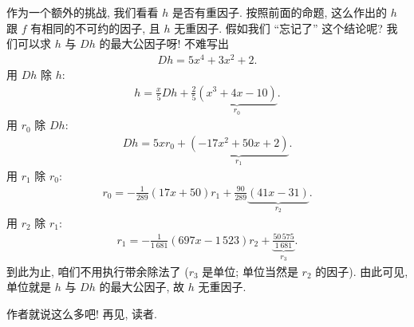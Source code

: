 \begin{example}
    作为一个额外的挑战, 我们看看 $h$ 是否有重因子. 按照前面的命题, 这么作出的 $h$ 跟 $f$ 有相同的不可约的因子, 且 $h$ 无重因子. 假如我们 ``忘记了'' 这个结论呢? 我们可以求 $h$ 与 $Dh$ 的最大公因子呀! 不难写出
    \begin{align*}
        Dh = 5x^4 + 3x^2 + 2.
    \end{align*}
    用 $Dh$ 除 $h$:
    \begin{align*}
        h = \frac{x}{5} Dh + \frac{2}{5} \underbrace{(x^3+4 x-10)}_{r_0}.
    \end{align*}
    用 $r_0$ 除 $Dh$:
    \begin{align*}
        Dh = 5x r_0 + \underbrace{(-17x^2 + 50x + 2)}_{r_1}.
    \end{align*}
    用 $r_1$ 除 $r_0$:
    \begin{align*}
        r_0 = -\frac{1}{289} (17x + 50) r_1 + \frac{90}{289} \underbrace{(41x-31)}_{r_2}.
    \end{align*}
    用 $r_2$ 除 $r_1$:
    \begin{align*}
        r_1 = -\frac{1}{1\,681} (697x - 1\,523) r_2 + \underbrace{\frac{50\,575}{1\,681}}_{r_3}.
    \end{align*}
    到此为止, 咱们不用执行带余除法了 ($r_3$ 是单位; 单位当然是 $r_2$ 的因子). 由此可见, 单位就是 $h$ 与 $Dh$ 的最大公因子, 故 $h$ 无重因子.
\end{example}

作者就说这么多吧! 再见, 读者.

